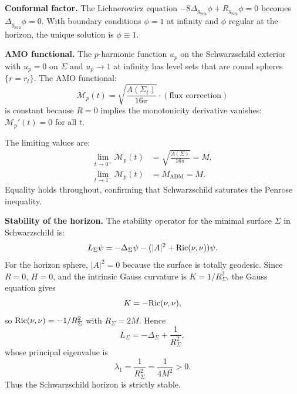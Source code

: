 \begin{example}
\textbf{Conformal factor.} The Lichnerowicz equation $-8\Delta_{g_{\mathrm{Sch}}} \phi + R_{g_{\mathrm{Sch}}} \phi = 0$ becomes $\Delta_{g_{\mathrm{Sch}}} \phi = 0$. With boundary conditions $\phi = 1$ at infinity and $\phi$ regular at the horizon, the unique solution is $\phi \equiv 1$.

\textbf{AMO functional.} The $p$-harmonic function $u_p$ on the Schwarzschild exterior with $u_p = 0$ on $\Sigma$ and $u_p \to 1$ at infinity has level sets that are round spheres $\{r = r_t\}$. The AMO functional:
\begin{equation}
    \mathcal{M}_p(t) = \sqrt{\frac{A(\Sigma_t)}{16\pi}} \cdot (\text{flux correction})
\end{equation}
is constant because $R = 0$ implies the monotonicity derivative vanishes: $\mathcal{M}_p'(t) = 0$ for all $t$.

The limiting values are:
\begin{align}
    \lim_{t \to 0^+} \mathcal{M}_p(t) &= \sqrt{\frac{A(\Sigma)}{16\pi}} = M, \\
    \lim_{t \to 1^-} \mathcal{M}_p(t) &= M_{\mathrm{ADM}} = M.
\end{align}
Equality holds throughout, confirming that Schwarzschild saturates the Penrose inequality.

\textbf{Stability of the horizon.} The stability operator for the minimal surface $\Sigma$ in Schwarzschild is:
\begin{equation}
    L_\Sigma \psi = -\Delta_\Sigma \psi - (|A|^2 + \mathrm{Ric}(\nu, \nu)) \psi.
\end{equation}
For the horizon sphere, $|A|^2 = 0$ because the surface is totally geodesic. Since $R=0$, $H=0$, and the intrinsic Gauss curvature is $K = 1/R_\Sigma^2$, the Gauss equation gives
\begin{equation}
    K = -\mathrm{Ric}(\nu,\nu),
\end{equation}
so $\mathrm{Ric}(\nu,\nu) = -1/R_\Sigma^2$ with $R_\Sigma = 2M$. Hence
\begin{equation}
    L_\Sigma = -\Delta_\Sigma + \frac{1}{R_\Sigma^2},
\end{equation}
whose principal eigenvalue is
\begin{equation}
    \lambda_1 = \frac{1}{R_\Sigma^2} = \frac{1}{4M^2} > 0.
\end{equation}
Thus the Schwarzschild horizon is strictly stable.


\end{example}
